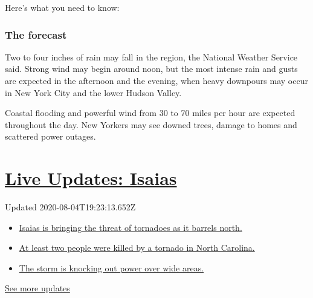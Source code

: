 Here's what you need to know:

\hypertarget{the-forecast}{%
\subsubsection{The forecast}\label{the-forecast}}

Two to four inches of rain may fall in the region, the National Weather
Service said. Strong wind may begin around noon, but the most intense
rain and gusts are expected in the afternoon and the evening, when heavy
downpours may occur in New York City and the lower Hudson Valley.

Coastal flooding and powerful wind from 30 to 70 miles per hour are
expected throughout the day. New Yorkers may see downed trees, damage to
homes and scattered power outages.

\hypertarget{live-updates-isaias}{%
\section{\texorpdfstring{\href{https://www.nytimes.com/2020/08/04/us/isaias-storm-updates.html?action=click\&pgtype=Article\&state=default\&region=MAIN_CONTENT_1\&context=storylines_live_updates}{Live
Updates: Isaias}}{Live Updates: Isaias}}\label{live-updates-isaias}}

Updated 2020-08-04T19:23:13.652Z

\begin{itemize}
\tightlist
\item
  \href{https://www.nytimes.com/2020/08/04/us/isaias-storm-updates.html?action=click\&pgtype=Article\&state=default\&region=MAIN_CONTENT_1\&context=storylines_live_updates\#link-362830dd}{Isaias
  is bringing the threat of tornadoes as it barrels north.}
\item
  \href{https://www.nytimes.com/2020/08/04/us/isaias-storm-updates.html?action=click\&pgtype=Article\&state=default\&region=MAIN_CONTENT_1\&context=storylines_live_updates\#link-7961bdbc}{At
  least two people were killed by a tornado in North Carolina.}
\item
  \href{https://www.nytimes.com/2020/08/04/us/isaias-storm-updates.html?action=click\&pgtype=Article\&state=default\&region=MAIN_CONTENT_1\&context=storylines_live_updates\#link-34e5d4e4}{The
  storm is knocking out power over wide areas.}
\end{itemize}

\href{https://www.nytimes.com/2020/08/04/us/isaias-storm-updates.html?action=click\&pgtype=Article\&state=default\&region=MAIN_CONTENT_1\&context=storylines_live_updates}{See
more updates}


